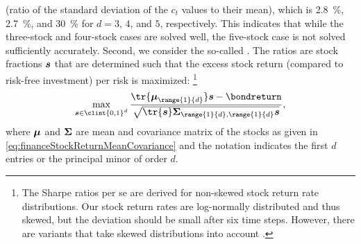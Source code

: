 (ratio of the standard deviation of the $c_t$ values to their mean),
which is \SI{2.8}{\percent}, \SI{2.7}{\percent}, and \SI{30}{\percent}
for $d = 3$, $4$, and $5$, respectively.
This indicates that while the three-stock and four-stock cases are
solved well, the five-stock case is not solved sufficiently accurately.
Second, we consider the so-called 
\cite{Sharpe66Mutual}.
The ratios are stock fractions ${\boldsymbol{s}}$ that are determined
such that the excess stock return (compared to risk-free investment)
per risk is maximized:%
\footnote{%
  The Sharpe ratios per se are derived for non-skewed
  stock return rate distributions.
  Our stock return rates are log-normally distributed and thus skewed,
  but the deviation should be small after six time steps.
  However, there are variants that
  take skewed distributions into account \cite{Mueller15Ansaetze}.%
}
{%
  \setlength{\abovedisplayskip}{9pt}%
  \setlength{\belowdisplayskip}{9pt}%
  \begin{equation}
    \max_{\vstock \in \clint{0, 1}^d}
    \frac{
      \tr{\*\mu_{\range{1}{d}}} \vstock - \bondreturn
    }{
      \sqrt{\tr{\vstock} \mat{\Sigma}_{\range{1}{d},\range{1}{d}} \vstock}
    },
  \end{equation}%
}%
where ${\boldsymbol{\mu}}$ and ${\boldsymbol{\Sigma}}$ are mean and covariance matrix
of the stocks as given in \cref{eq:financeStockReturnMeanCovariance}
and the notation indicates the first $d$ entries or
the principal minor of order $d$.

% 
% 
% 
% 


